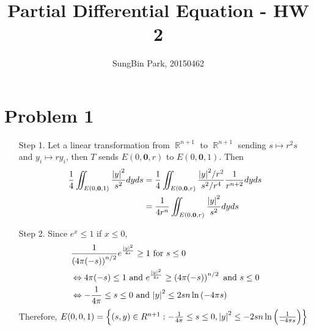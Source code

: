 \documentclass{article}
\DeclareMathOperator{\rr}{\mathbb{R}}
\begin{document}
\title{Partial Differential Equation - HW 2}
\author{SungBin Park, 20150462} 

 \maketitle

\section*{Problem 1}
\begin{enumerate}
	\item [Step 1.] Let a linear transformation from $\rr^{n+1}$ to $\rr^{n+1}$ sending $s\mapsto r^2 s$ and $y_i\mapsto ry_i$, then $T$ sends $E(0, \bm{0}, r)$ to $E(0, \bm{0}, 1)$. Then
	\begin{equation*}
	\begin{split}
	\frac{1}{4}\iint_{E(0, \bm{0}, 1)}\frac{\abs{y}^2}{s^2}dyds&=\frac{1}{4}\iint_{E(0, \bm{0}, r)}\frac{\abs{y}^2/r^2}{s^2/r^4}\frac{1}{r^{n+2}}dyds \\
	&=\frac{1}{4r^n}\iint_{E(0, \bm{0}, r)}\frac{\abs{y}^2}{s^2}dyds
	\end{split}
	\end{equation*}
    \item [Step 2.] Since $e^x\leq 1$ if $x\leq 0$,
    \begin{equation*}
        \begin{split}
            &\frac{1}{\left(4\pi(-s)\right)^{n/2}}e^{\frac{\abs{y}^2}{4s}}\geq 1 \text{ for }s\leq 0\\
            &\Leftrightarrow 4\pi(-s)\leq 1 \text{ and }e^{\frac{\abs{y}^2}{4s}}\geq \left(4\pi(-s)\right)^{n/2} \text{ and } s\leq 0\\
            &\Leftrightarrow -\frac{1}{4\pi}\leq s\leq 0 \text{ and } \abs{y}^2\leq 2sn\ln{(-4\pi s)}
        \end{split}
    \end{equation*}
    Therefore, $E(0,0,1)=\left\{(s,y)\in R^{n+1}:-\frac{1}{4\pi}\leq s\leq 0 , \abs{y}^2\leq -2sn\ln{\left(\frac{1}{-4\pi s}\right)}\right\}$
    

\end{enumerate}
\end{document}
